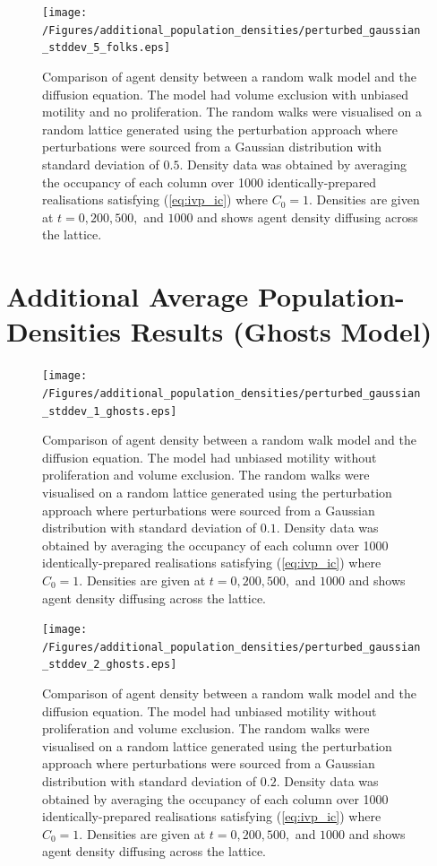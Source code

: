 \documentclass[11pt,titlepage,a4paper]{article}
\begin{document}
\begin{appendix}
		\clearpage
		\begin{figure}[tbh]
			\centering
				\texttt{[image: /Figures/additional\_population\_densities/perturbed\_gaussian\_stddev\_5\_folks.eps]}
			\caption{Comparison of agent density between a random walk model and the diffusion equation. The model had volume exclusion with unbiased motility and no proliferation. The random walks were visualised on a random lattice generated using the perturbation approach where perturbations were sourced from a Gaussian distribution with standard deviation of $0.5$. Density data was obtained by averaging the occupancy of each column over 1000 identically-prepared realisations satisfying (\ref{eq:ivp_ic}) where $C_0 = 1$. Densities are given at $t = 0, 200, 500,$ and $1000$ and shows agent density diffusing across the lattice.}
			\label{fig:perturbed_gaussian_stddev_5_folks}
		\end{figure}

	\pagebreak
	\section{Additional Average Population-Densities Results (Ghosts Model)}
	\label{appendix:populationdensities_ghosts}
	\setcounter{figure}{0}

		\begin{figure}[tbh]
			\centering
				\texttt{[image: /Figures/additional\_population\_densities/perturbed\_gaussian\_stddev\_1\_ghosts.eps]}
			\caption{Comparison of agent density between a random walk model and the diffusion equation. The model had unbiased motility without proliferation and volume exclusion. The random walks were visualised on a random lattice generated using the perturbation approach where perturbations were sourced from a Gaussian distribution with standard deviation of $0.1$. Density data was obtained by averaging the occupancy of each column over 1000 identically-prepared realisations satisfying (\ref{eq:ivp_ic}) where $C_0 = 1$. Densities are given at $t = 0, 200, 500,$ and $1000$ and shows agent density diffusing across the lattice.}
			\label{fig:perturbed_gaussian_stddev_1_ghosts}
		\end{figure}

		\clearpage
		\begin{figure}[tbh]
			\centering
				\texttt{[image: /Figures/additional\_population\_densities/perturbed\_gaussian\_stddev\_2\_ghosts.eps]}
			\caption{Comparison of agent density between a random walk model and the diffusion equation. The model had unbiased motility without proliferation and volume exclusion. The random walks were visualised on a random lattice generated using the perturbation approach where perturbations were sourced from a Gaussian distribution with standard deviation of $0.2$. Density data was obtained by averaging the occupancy of each column over 1000 identically-prepared realisations satisfying (\ref{eq:ivp_ic}) where $C_0 = 1$. Densities are given at $t = 0, 200, 500,$ and $1000$ and shows agent density diffusing across the lattice.}
			\label{fig:perturbed_gaussian_stddev_2_ghosts}
		\end{figure}


\end{appendix}
\end{document}

